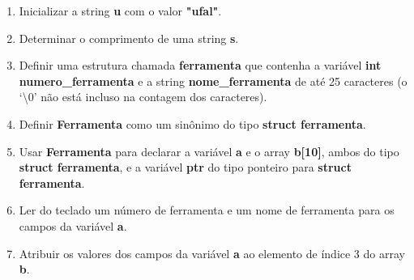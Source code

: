 \documentclass[a4paper,10pt]{article}
\begin{document}
\begin{multicols*}{2}
\begin{enumerate}
\begin{enumerate}

    \item Inicializar a string \textbf{u} com o valor \textbf{"ufal"}.

    \item Determinar o comprimento de uma string \textbf{s}.

    \item Definir uma estrutura chamada \textbf{ferramenta} que contenha a variável \textbf{int numero\_ferramenta} e a string \textbf{nome\_ferramenta} de até 25 caracteres (o `\textbackslash0' não está incluso na contagem dos caracteres).

    \item Definir \textbf{Ferramenta} como um sinônimo do tipo \textbf{struct ferramenta}.

    \item Usar \textbf{Ferramenta} para declarar a variável \textbf{a} e o array \textbf{b{[}10{]}}, ambos do tipo \textbf{struct ferramenta}, e a variável \textbf{ptr} do tipo ponteiro para \textbf{struct ferramenta}.

    \item Ler do teclado um número de ferramenta e um nome de ferramenta para os campos da variável \textbf{a}.

    \item Atribuir os valores dos campos da variável \textbf{a} ao elemento de índice 3 do array \textbf{b}.


\end{enumerate}
\end{enumerate}
\end{multicols*}
\end{document}
